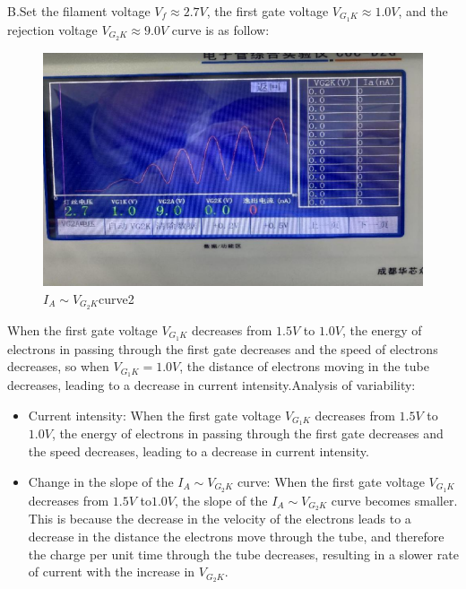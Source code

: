 \documentclass[UTF8]{article}
\begin{document}
B.Set the filament voltage $V_f\approx 2.7V$, the first gate voltage $V_{G_1K}\approx 1.0V$, and the rejection voltage $V_{G_2K}\approx 9.0V$ curve is as follow:
\begin{figure}[H]
            	\centering
            	\includegraphics[clip,scale=0.8,trim={0 0 0 0}]{fig/fig12.png}
            	\caption{$I_A\sim V_{G_2K}$curve2}
            	\label{figure.12}
\end{figure}
When the first gate voltage $V_{G_1K}$ decreases from $1.5V$ to $1.0V$, the energy of electrons in passing through the first gate decreases and the speed of electrons decreases, so when $V_{G_1K}=1.0V$, the distance of electrons moving in the tube decreases, leading to a decrease in current intensity.Analysis of variability:
\begin{itemize}
\item Current intensity: When the first gate voltage $V_{G_1K}$ decreases from $1.5V$ to $1.0V$, the energy of electrons in passing through the first gate decreases and the speed decreases, leading to a decrease in current intensity. 
\item Change in the slope of the $I_A\sim V_{G_2K}$ curve: When the first gate voltage $V_{G_1K}$ decreases from $1.5V$ to$1.0V$, the slope of the $I_A\sim V_{G_2K}$ curve becomes smaller. This is because the decrease in the velocity of the electrons leads to a decrease in the distance the electrons move through the tube, and therefore the charge per unit time through the tube decreases, resulting in a slower rate of current with the increase in $V_{G_2K}$.
\end{itemize}
\end{document}
